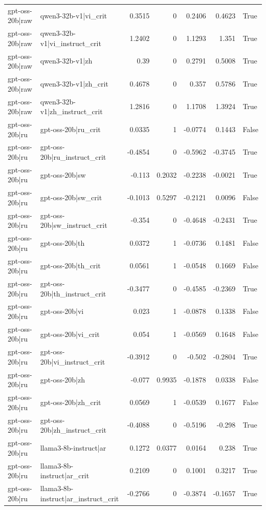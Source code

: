 \begin{table}
\begin{tabular}{l l r r r r l}
gpt-oss-20b|raw & qwen3-32b-v1|vi_crit & 0.3515 & 0 & 0.2406 & 0.4623 & True \\
gpt-oss-20b|raw & qwen3-32b-v1|vi_instruct_crit & 1.2402 & 0 & 1.1293 & 1.351 & True \\
gpt-oss-20b|raw & qwen3-32b-v1|zh & 0.39 & 0 & 0.2791 & 0.5008 & True \\
gpt-oss-20b|raw & qwen3-32b-v1|zh_crit & 0.4678 & 0 & 0.357 & 0.5786 & True \\
gpt-oss-20b|raw & qwen3-32b-v1|zh_instruct_crit & 1.2816 & 0 & 1.1708 & 1.3924 & True \\
gpt-oss-20b|ru & gpt-oss-20b|ru_crit & 0.0335 & 1 & -0.0774 & 0.1443 & False \\
gpt-oss-20b|ru & gpt-oss-20b|ru_instruct_crit & -0.4854 & 0 & -0.5962 & -0.3745 & True \\
gpt-oss-20b|ru & gpt-oss-20b|sw & -0.113 & 0.2032 & -0.2238 & -0.0021 & True \\
gpt-oss-20b|ru & gpt-oss-20b|sw_crit & -0.1013 & 0.5297 & -0.2121 & 0.0096 & False \\
gpt-oss-20b|ru & gpt-oss-20b|sw_instruct_crit & -0.354 & 0 & -0.4648 & -0.2431 & True \\
gpt-oss-20b|ru & gpt-oss-20b|th & 0.0372 & 1 & -0.0736 & 0.1481 & False \\
gpt-oss-20b|ru & gpt-oss-20b|th_crit & 0.0561 & 1 & -0.0548 & 0.1669 & False \\
gpt-oss-20b|ru & gpt-oss-20b|th_instruct_crit & -0.3477 & 0 & -0.4585 & -0.2369 & True \\
gpt-oss-20b|ru & gpt-oss-20b|vi & 0.023 & 1 & -0.0878 & 0.1338 & False \\
gpt-oss-20b|ru & gpt-oss-20b|vi_crit & 0.054 & 1 & -0.0569 & 0.1648 & False \\
gpt-oss-20b|ru & gpt-oss-20b|vi_instruct_crit & -0.3912 & 0 & -0.502 & -0.2804 & True \\
gpt-oss-20b|ru & gpt-oss-20b|zh & -0.077 & 0.9935 & -0.1878 & 0.0338 & False \\
gpt-oss-20b|ru & gpt-oss-20b|zh_crit & 0.0569 & 1 & -0.0539 & 0.1677 & False \\
gpt-oss-20b|ru & gpt-oss-20b|zh_instruct_crit & -0.4088 & 0 & -0.5196 & -0.298 & True \\
gpt-oss-20b|ru & llama3-8b-instruct|ar & 0.1272 & 0.0377 & 0.0164 & 0.238 & True \\
gpt-oss-20b|ru & llama3-8b-instruct|ar_crit & 0.2109 & 0 & 0.1001 & 0.3217 & True \\
gpt-oss-20b|ru & llama3-8b-instruct|ar_instruct_crit & -0.2766 & 0 & -0.3874 & -0.1657 & True \\

\end{tabular}
\end{table}
